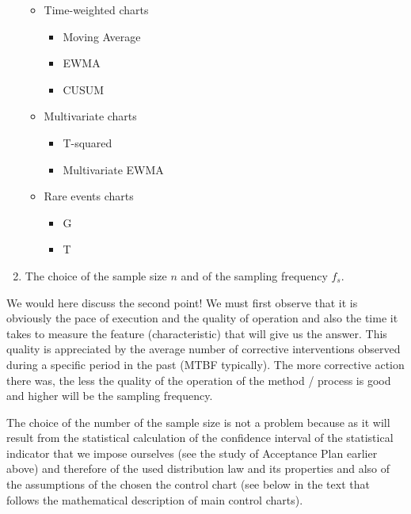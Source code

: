 \begin{enumerate}
\begin{itemize}
			\item Time-weighted charts
			\begin{itemize}
				\item Moving Average
				\item EWMA
				\item CUSUM
			\end{itemize}
	
			\item Multivariate charts
			\begin{itemize}
				\item T-squared
				\item Multivariate EWMA
			\end{itemize}
	
			\item Rare events charts
			\begin{itemize}
				\item G
				\item T
			\end{itemize}
		\end{itemize}

		\item The choice of the sample size $n$ and of the sampling frequency $f_s$.
	\end{enumerate}
	We would here discuss the second point! We must first observe that it is obviously the pace of execution and the quality of operation and also the time it takes to measure the feature (characteristic) that will give us the answer. This quality is appreciated by the average number of corrective interventions observed during a specific period in the past (MTBF typically). The more corrective action there was, the less the quality of the operation of the method / process is good and higher will be the sampling frequency.
	
	The choice of the number of the sample size is not a problem because as it will result from the statistical calculation of the confidence interval of the statistical indicator that we impose ourselves (see the study of Acceptance Plan earlier above) and therefore of the used distribution law and its properties and also of the assumptions of the chosen the control chart (see below in the text that follows the mathematical description of main control charts).
	
